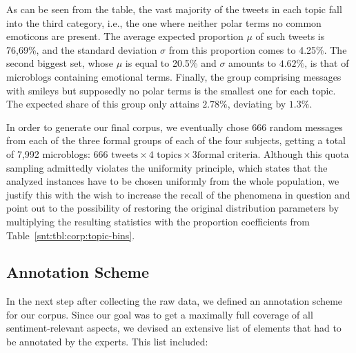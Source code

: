 As can be seen from the table, the vast majority of the tweets in each
topic fall into the third category, i.e., the one where neither polar
terms no common emoticons are present.  The average expected
proportion $\mu$ of such tweets is 76,69\%, and the standard deviation
$\sigma$ from this proportion comes to 4.25\%.  The second biggest
set, whose $\mu$ is equal to 20.5\% and $\sigma$ amounts to $4.62\%$,
is that of microblogs containing emotional terms.  Finally, the group
comprising messages with smileys but supposedly no polar terms is the
smallest one for each topic.  The expected share of this group only
attains $2.78\%$, deviating by $1.3\%$.


In order to generate our final corpus, we eventually chose 666 random
messages from each of the three formal groups of each of the four
subjects, getting a total of 7,992 microblogs: $666\text{ tweets}
\times 4\text{ topics} \times 3\text{formal criteria}$.  Although this
quota sampling admittedly violates the uniformity principle, which
states that the analyzed instances have to be chosen uniformly from
the whole population, we justify this with the wish to increase the
recall of the phenomena in question and point out to the possibility
of restoring the original distribution parameters by multiplying the
resulting statistics with the proportion coefficients from
Table~\ref{snt:tbl:corp:topic-bins}.

\subsection{Annotation Scheme}\label{subsec:snt:ascheme}
In the next step after collecting the raw data, we defined an
annotation scheme for our corpus. Since our goal was to get a
maximally full coverage of all sentiment-relevant aspects, we devised
an extensive list of elements that had to be annotated by the experts.
This list included:


